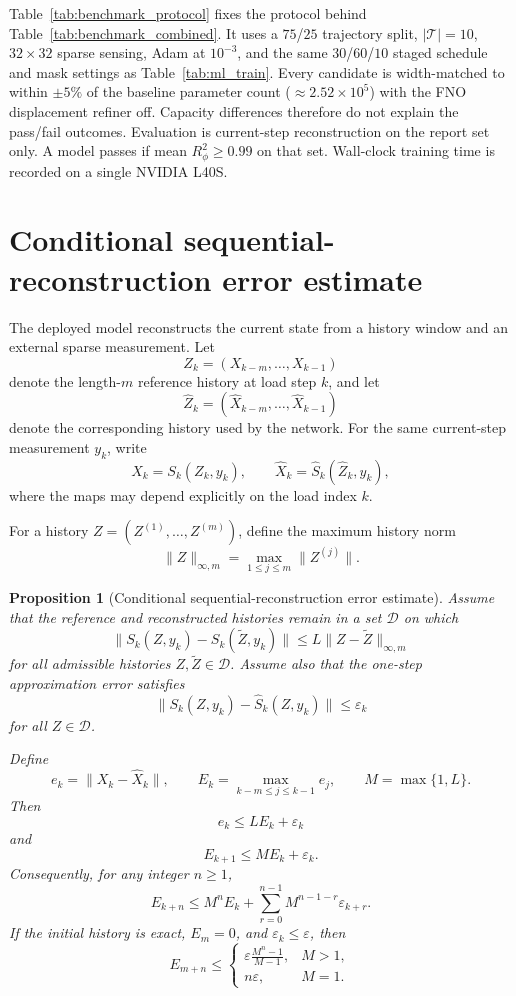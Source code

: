 \documentclass[10pt]{article}
\newtheorem{proposition}[theorem]{Proposition}
\theoremstyle{definition}
\begin{document}
Table~\ref{tab:benchmark_protocol} fixes the protocol behind Table~\ref{tab:benchmark_combined}.
%
It uses a $75$/$25$ trajectory split, $|\mathcal{T}|=10$, $32\times32$ sparse sensing, Adam at $10^{-3}$, and the same $30$/$60$/$10$ staged schedule and mask settings as Table~\ref{tab:ml_train}.
%
Every candidate is width-matched to within $\pm5\%$ of the baseline parameter count ($\approx2.52\times10^{5}$) with the FNO displacement refiner off.
%
Capacity differences therefore do not explain the pass/fail outcomes.
%
Evaluation is current-step reconstruction on the report set only.
%
A model passes if mean $R^2_{\phi}\ge0.99$ on that set.
%
Wall-clock training time is recorded on a single NVIDIA L40S.

\section{Conditional sequential-reconstruction error estimate}
\label{app:sequential_error}

The deployed model reconstructs the current state from a history window and
an external sparse measurement. Let
\[
Z_k=(X_{k-m},\ldots,X_{k-1})
\]
denote the length-$m$ reference history at load step $k$, and let
\[
\widehat{Z}_k
=
(\widehat{X}_{k-m},\ldots,\widehat{X}_{k-1})
\]
denote the corresponding history used by the network. For the same
current-step measurement $y_k$, write
\[
X_k=S_k(Z_k,y_k),
\qquad
\widehat{X}_k=\widehat{S}_k(\widehat{Z}_k,y_k),
\]
where the maps may depend explicitly on the load index $k$.

For a history $Z=(Z^{(1)},\ldots,Z^{(m)})$, define the maximum history norm
\[
\|Z\|_{\infty,m}
=
\max_{1\leq j\leq m}\|Z^{(j)}\|.
\]

\begin{proposition}[Conditional sequential-reconstruction error estimate]
Assume that the reference and reconstructed histories remain in a set
$\mathcal{D}$ on which
\[
\|S_k(Z,y_k)-S_k(\widetilde{Z},y_k)\|
\leq
L\|Z-\widetilde{Z}\|_{\infty,m}
\]
for all admissible histories $Z,\widetilde{Z}\in\mathcal{D}$. Assume also
that the one-step approximation error satisfies
\[
\|S_k(Z,y_k)-\widehat{S}_k(Z,y_k)\|
\leq
\varepsilon_k
\]
for all $Z\in\mathcal{D}$.

Define
\[
e_k=\|X_k-\widehat{X}_k\|,
\qquad
E_k=\max_{k-m\leq j\leq k-1}e_j,
\qquad
M=\max\{1,L\}.
\]
Then
\[
e_k\leq L E_k+\varepsilon_k
\]
and
\[
E_{k+1}\leq M E_k+\varepsilon_k.
\]
Consequently, for any integer $n\geq1$,
\[
E_{k+n}
\leq
M^nE_k
+
\sum_{r=0}^{n-1}M^{n-1-r}\varepsilon_{k+r}.
\]
If the initial history is exact, $E_m=0$, and
$\varepsilon_k\leq\varepsilon$, then
\[
E_{m+n}
\leq
\begin{cases}
\displaystyle
\varepsilon\frac{M^n-1}{M-1},
& M>1,\\[8pt]
n\varepsilon,
& M=1.
\end{cases}
\]
\end{proposition}
\end{document}
